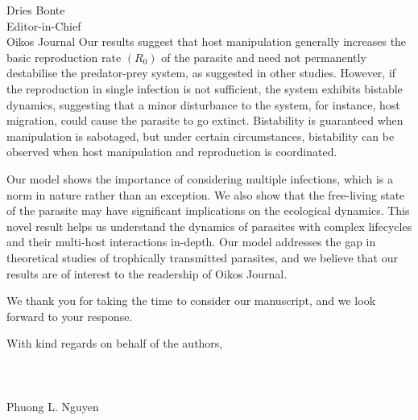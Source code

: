 \documentclass[10,DIN, pagenumber=false, parskip=half,fromalign=right, fromphone=false,fromemail=true, fromurl=false,fromlogo=true, fromrule=false]{scrlttr2}
\begin{document}
\begin{letter}{
\sffamily
\vspace{-0.4cm}
Dries Bonte \\
Editor-in-Chief\\
Oikos Journal
}
Our results suggest that host manipulation generally increases the basic reproduction rate $(R_0)$ of the parasite and need not permanently destabilise the predator-prey system, as suggested in other studies.
However, if the reproduction in single infection is not sufficient, the system exhibits bistable dynamics, suggesting that a minor disturbance to the system, for instance, host migration, could cause the parasite to go extinct.
Bistability is guaranteed when manipulation is sabotaged, but under certain circumstances, bistability can be observed when host manipulation and reproduction is coordinated.

Our model shows the importance of considering multiple infections, which is a norm in nature rather than an exception. 
We also show that the free-living state of the parasite may have significant implications on the ecological dynamics.
This novel result helps us understand the dynamics of parasites with complex lifecycles and their multi-host interactions in-depth. 
Our model addresses the gap in theoretical studies of trophically transmitted parasites, and we believe that our results are of interest to the readership of Oikos Journal.

We thank you for taking the time to consider our manuscript, and we look forward to your response.

With kind regards on behalf of the authors,\\
\\
\\
\\
Phuong L. Nguyen

\end{letter}
\end{document}
